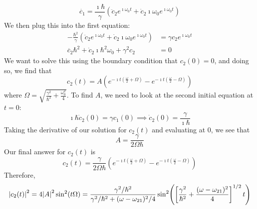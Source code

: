\documentclass[a4paper,twoside]{article}
\begin{document}
\begin{itemize}
\begin{problem}
           \begin{equation}
               \dot{c_1} = \frac{\imath \hbar}{\gamma} \left( \ddot{c}_2 e^{\imath \omega_0 t} + \dot{c}_2 \imath \omega_0 e^{\imath \omega_0 t} \right)
           \end{equation}
           We then plug this into the first equation:
           \begin{align}
               - \frac{\hbar^2}{\gamma} \left( \ddot{c}_2 e^{\imath \omega_0 t} + \dot{c}_2 \imath \omega_0 e^{\imath \omega_0 t}\right) &= \gamma c_2 e^{\imath \omega_0 t} \\
                \ddot{c_2} \hbar^2 + \dot{c}_2 \imath \hbar^2 \omega_0 + \gamma^2 c_2 &= 0
           \end{align}
           We want to solve this using the boundary condition that $ c_2(0) = 0 $, and doing so, we find that
           \begin{equation}
               c_2(t) = A \left( e^{- \imath t \left( \frac{\omega}{2} + \Omega \right)} - e^{- \imath t \left( \frac{\omega}{2} - \Omega \right)} \right)
           \end{equation}
           where $ \Omega = \sqrt{\frac{\gamma^2}{\hbar^2} + \frac{\omega_0^2}{4}} $. To find $ A $, we need to look at the second initial equation at $ t=0 $:
           \begin{equation}
               \imath \hbar \dot{c}_2(0) = \gamma c_1(0) \implies \dot{c}_2(0) = \frac{\gamma}{\imath \hbar}
           \end{equation}
           Taking the derivative of our solution for $ c_2(t) $ and evaluating at $ 0 $, we see that
           \begin{equation}
               A = \frac{\gamma}{2 \Omega \hbar}
           \end{equation}
           Our final answer for $ c_2(t) $ is
           \begin{equation}
               c_2(t) = \frac{\gamma}{2 \Omega \hbar} \left( e^{- \imath t \left( \frac{\omega}{2} + \Omega \right)} - e^{- \imath t \left( \frac{\omega}{2} - \Omega \right)} \right)
           \end{equation}
           Therefore,
           \begin{equation}
               \abs{c_2(t)}^2 = 4 \abs{A}^2 \sin[2](t \Omega) =  \frac{\gamma^2 / \hbar^2}{\gamma^2 / \hbar^2 + (\omega - \omega_{21})^2 / 4} \sin[2](\left[ \frac{\gamma^2}{\hbar^2} + \frac{(\omega - \omega_{21})^2}{4} \right]^{1/2} t)
           \end{equation}

\end{problem}
\end{itemize}
\end{document}
